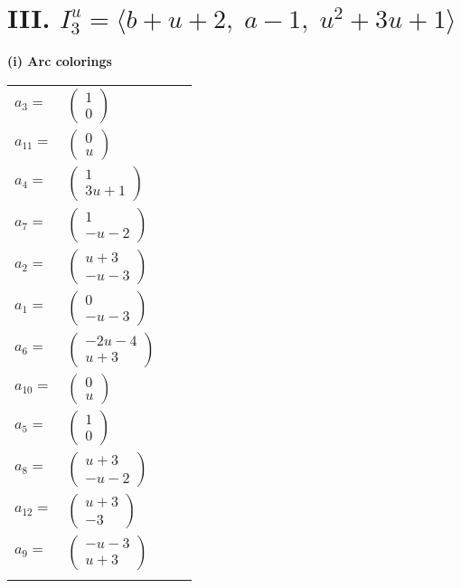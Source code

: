 \documentclass[1p]{elsarticle_modified}
\theoremstyle{definition}
\begin{document}
\centering \section*{III. $I^u_{3}= \langle b+u+2,\;a-1,\;u^2+3 u+1 \rangle$}
\flushleft \textbf{(i) Arc colorings}\\
\begin{tabular}{m{7pt} m{180pt} m{7pt} m{180pt} }
\flushright $a_{3}=$&$\begin{pmatrix}1\\0\end{pmatrix}$ \\
\flushright $a_{11}=$&$\begin{pmatrix}0\\u\end{pmatrix}$ \\
\flushright $a_{4}=$&$\begin{pmatrix}1\\3 u+1\end{pmatrix}$ \\
\flushright $a_{7}=$&$\begin{pmatrix}1\\- u-2\end{pmatrix}$ \\
\flushright $a_{2}=$&$\begin{pmatrix}u+3\\- u-3\end{pmatrix}$ \\
\flushright $a_{1}=$&$\begin{pmatrix}0\\- u-3\end{pmatrix}$ \\
\flushright $a_{6}=$&$\begin{pmatrix}-2 u-4\\u+3\end{pmatrix}$ \\
\flushright $a_{10}=$&$\begin{pmatrix}0\\u\end{pmatrix}$ \\
\flushright $a_{5}=$&$\begin{pmatrix}1\\0\end{pmatrix}$ \\
\flushright $a_{8}=$&$\begin{pmatrix}u+3\\- u-2\end{pmatrix}$ \\
\flushright $a_{12}=$&$\begin{pmatrix}u+3\\-3\end{pmatrix}$ \\
\flushright $a_{9}=$&$\begin{pmatrix}- u-3\\u+3\end{pmatrix}$\\&\end{tabular}
\end{document}
